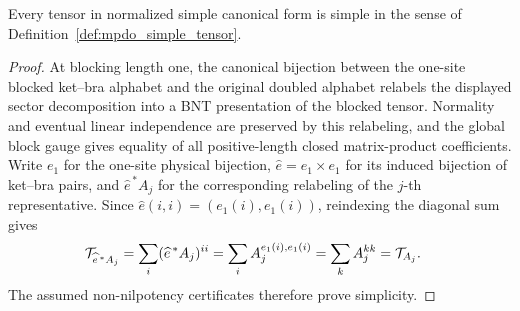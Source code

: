 \begin{lemma}
    \label{thm:mpdo_simple_cf_is_simple}
    \leanok
    Every tensor in normalized simple canonical form is simple in the sense of
    Definition~\ref{def:mpdo_simple_tensor}.
\end{lemma}

\begin{proof}\leanok
    At blocking length one, the canonical bijection between the
    one-site blocked ket--bra alphabet and the original doubled alphabet
    relabels the displayed sector decomposition into a BNT presentation of the
    blocked tensor. Normality and eventual linear independence are preserved
    by this relabeling, and the global block gauge gives equality of all
    positive-length closed matrix-product coefficients. Write $e_1$ for the
    one-site physical bijection, $\widehat e=e_1\times e_1$ for its induced
    bijection of ket--bra pairs, and $\widehat e^{\,*}A_j$ for the corresponding
    relabeling of the $j$-th representative. Since
    $\widehat e(i,i)=(e_1(i),e_1(i))$, reindexing the diagonal sum gives
    \begin{align}
        \mathcal T_{\widehat e^{\,*}A_j}
         & =\sum_i(\widehat e^{\,*}A_j)^{ii}
        =\sum_iA_j^{e_1(i),e_1(i)}
        =\sum_kA_j^{kk}
        =\mathcal T_{A_j}.
        \notag
    \end{align}
    The assumed non-nilpotency certificates therefore prove simplicity.
\end{proof}
